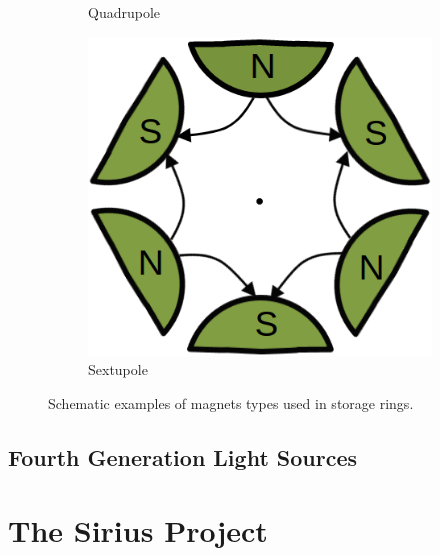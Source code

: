 \begin{figure}
\begin{subfigure}[t]{0.32\textwidth}
    \caption{Quadrupole}
    \label{fig:nperiodic2}
\end{subfigure}
 \begin{subfigure}[t]{0.32\textwidth}
    \includegraphics[width=1.08\textwidth]{figures/sextupole_example.png}
    \caption{Sextupole}
    \label{fig:npdiflog}
\end{subfigure}
\caption{Schematic examples of magnets types used in storage rings.}
\label{fig:subfigures}
\end{figure}
\subsection{Fourth Generation Light Sources}\label{subsec:fourth_generation}


\section{The Sirius Project}\label{sec:sirius_project}
